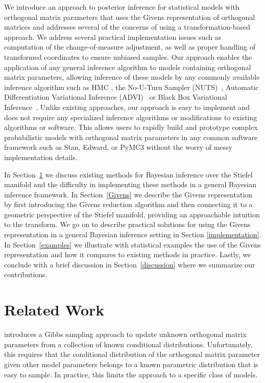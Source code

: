 \documentclass[ba]{imsart}
\numberwithin{equation}{section}
\theoremstyle{plain}
\begin{document}
\noindent We introduce an approach to posterior inference for statistical models with orthogonal matrix parameters that uses the Givens representation of orthogonal matrices and addresses several of the concerns of using a transformation-based approach. We address several practical implementation issues such as computation of the change-of-measure adjustment, as well as proper handling of transformed coordinates to ensure unbiased samples. Our approach enables the application of any general inference algorithm to models containing orthogonal matrix parameters, allowing inference of these models by any commonly available inference algorithm such as HMC \cite{neal2011mcmc}, the No-U-Turn Sampler (NUTS)~\citep{hoffman2014no}, Automatic Differentiation Variational Inference (ADVI)~\citep{kucukelbir2014fully} or Black Box Variational Inference~\citep{ranganath2014black}. Unlike existing approaches, our approach is easy to implement and does not require any specialized inference algorithms or modifications to existing algorithms or software. This allows users to rapidly build and prototype complex probabilistic models with orthogonal matrix parameters in any common software framework such as Stan, Edward, or PyMC3 without the worry of messy implementation details. 

\noindent In Section~\ref{related} we discuss existing methods for Bayesian inference over the Stiefel manifold and the difficulty in implementing these methods in a general Bayesian inference framework. In Section~\ref{Givens} we describe the Givens representation by first introducing the Givens reduction algorithm and then connecting it to a geometric perspective of the Stiefel manifold, providing an approachable intuition to the transform. We go on to describe practical solutions for using the Givens representation in a general Bayesian inference setting in Section \ref{implementation}. In Section~\ref{examples} we illustrate with statistical examples the use of the Givens representation and how it compares to existing methods in practice. Lastly, we conclude with a brief discussion in Section~\ref{discussion} where we summarize our contributions.

\section{Related Work} \label{related}
\cite{hoff2009simulation} introduces a Gibbs sampling approach to update unknown orthogonal matrix parameters from a collection of known conditional distributions. Unfortunately, this requires that the conditional distribution of the orthogonal matrix parameter given other model parameters belongs to a known parametric distribution that is easy to sample. In practice, this limits the approach to a specific class of models.
\end{document}

